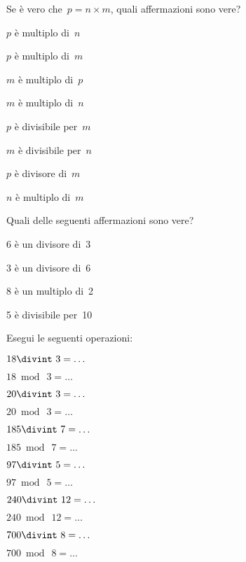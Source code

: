 \begin{esercizio}
\label{ese:1.4}
 Se è vero che~\(p=n\times m\), quali affermazioni sono vere?
\begin{multicols}{2}
\TabPositions{3.2cm}
\begin{enumeratea}
 \item \(p\) è multiplo di~\(n\)	\tab\boxV\quad\boxF
 \item \(p\) è multiplo di~\(m\)	\tab\boxV\quad\boxF
 \item \(m\) è multiplo di~\(p\)	\tab\boxV\quad\boxF
 \item \(m\) è multiplo di~\(n\)	\tab\boxV\quad\boxF
 \item \(p\) è divisibile per~\(m\)	\tab\boxV\quad\boxF
 \item \(m\) è divisibile per~\(n\)	\tab\boxV\quad\boxF
 \item \(p\) è divisore di~\(m\)	\tab\boxV\quad\boxF
 \item \(n\) è multiplo di~\(m\)	\tab\boxV\quad\boxF
\end{enumeratea}
\end{multicols}
\end{esercizio}

\begin{esercizio}
\label{ese:1.5}
 Quali delle seguenti affermazioni sono vere?

\begin{multicols}{2}
\TabPositions{3.2cm}
 \begin{enumeratea}
 \item 6 è un divisore di~3 \tab\boxV\quad\boxF
 \item 3 è un divisore di~6 \tab\boxV\quad\boxF
 \item 8 è un multiplo di~2 \tab\boxV\quad\boxF
 \item 5 è divisibile per~10 \tab\boxV\quad\boxF
 \end{enumeratea}
\end{multicols}
\end{esercizio}

\begin{esercizio}
\label{ese:1.6}
 Esegui le seguenti operazioni:
\begin{multicols}{3}
 \begin{enumeratea}
 \item \(18\divint~3=\ldots\)
 \item \(18\bmod~3=\ldots\)
 \item \(20\divint~3=\ldots\)
 \item \(20\bmod~3=\ldots\)
 \item \(185\divint~7=\ldots\)
 \item \(185\bmod~7=\ldots\)
 \item \(97\divint~5=\ldots\)
 \item \(97\bmod~5=\ldots\)
 \item \(240\divint~12=\ldots\)
 \item \(240\bmod~12=\ldots\)
 \item \(700\divint~8=\ldots\)
 \item \(700\bmod~8=\ldots\)
 \end{enumeratea}
\end{multicols}
\end{esercizio}

